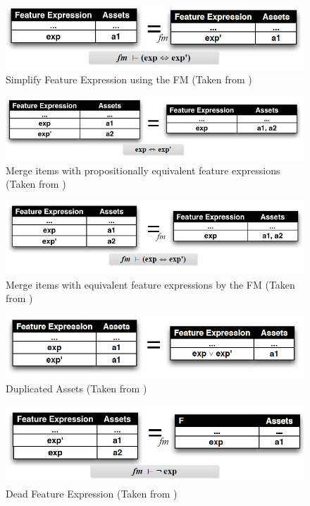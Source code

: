 \documentclass[12pt]{article}
\begin{document}
\begin{figure}[H]
\centering
\includegraphics[width=1\textwidth, frame]{images/SimplifyFeatureExpression2}
\caption{Simplify Feature Expression using the FM (Taken from \cite{msclmt})}
\end{figure}

\begin{figure}[H]
\centering
\includegraphics[width=1\textwidth, frame]{images/MergeItems}
\caption{Merge items with propositionally equivalent feature expressions (Taken from \cite{msclmt})}
\end{figure}

\begin{figure}[H]
\centering
\includegraphics[width=1\textwidth, frame]{images/MergeItems2}
\caption{Merge items with equivalent feature expressions by the FM (Taken from \cite{msclmt})}
\end{figure}

\begin{figure}[H]
\centering
\includegraphics[width=1\textwidth, frame]{images/DuplicatedAssets}
\caption{Duplicated Assets (Taken from \cite{msclmt})}
\end{figure}

\begin{figure}[H]
\centering
\includegraphics[width=1\textwidth, frame]{images/DeadFeatureExpression}
\caption{Dead Feature Expression (Taken from \cite{msclmt})}
\end{figure}
\end{document}
